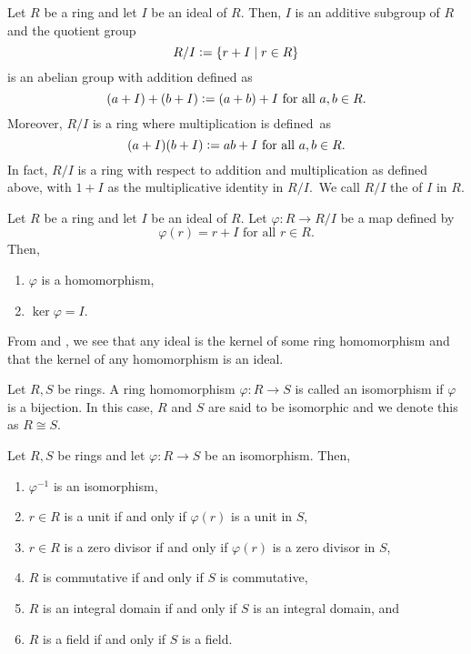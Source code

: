 \begin{defn}
    Let $R$ be a ring and let $I$ be an ideal of $R$. Then, $I$ is an additive subgroup of $R$ and the quotient group
    \[
        R/I \vcentcolon= \left\{ r + I \mid r \in R \right\}
    \]
    is an abelian group with addition defined as
    \[
        (a+I) + (b+I) \vcentcolon= (a+b) + I \text{ for all } a,b \in R.
    \]
    Moreover, $R/I$ is a ring where multiplication is defined\footnotemark\ as
    \[
        (a + I) (b + I) \vcentcolon= ab + I \text{ for all } a,b \in R.
    \]
    In fact, $R/I$ is a ring with respect to addition and multiplication as defined above, with $1+I$ as the multiplicative identity in $R/I$.\footnotemark\ We call $R/I$ the  of $I$ in $R$.
\end{defn}

\begin{prop} \label{prop:ideal-is-kernel}
    Let $R$ be a ring and let $I$ be an ideal of $R$. Let $\varphi \colon R \to R/I$ be a map defined by
    \[
        \varphi(r) = r + I \text{ for all } r \in R.
    \]
    Then, 
    \begin{enumerate}
        \item $\varphi$ is a homomorphism,
        \item $\ker\varphi = I$.
    \end{enumerate}
\end{prop}

From  and , we see that any ideal is the kernel of some ring homomorphism and that the kernel of any homomorphism is an ideal.

\begin{defn}[Isomorphism]
    Let $R,S$ be rings. A ring homomorphism $\varphi \colon R \to S$ is called an isomorphism if $\varphi$ is a bijection. In this case, $R$ and $S$ are said to be isomorphic and we denote this as $R \cong S$.
\end{defn}

\begin{exe}
    Let $R,S$ be rings and let $\varphi \colon R \to S$ be an isomorphism. Then,
    \begin{enumerate}
        \item $\varphi^{-1}$ is an isomorphism,
        \item $r \in R$ is a unit if and only if $\varphi(r)$ is a unit in $S$,
        \item $r \in R$ is a zero divisor if and only if $\varphi(r)$ is a zero divisor in $S$,
        \item $R$ is commutative if and only if $S$ is commutative,
        \item $R$ is an integral domain if and only if $S$ is an integral domain, and
        \item $R$ is a field if and only if $S$ is a field.
    \end{enumerate}
\end{exe}

